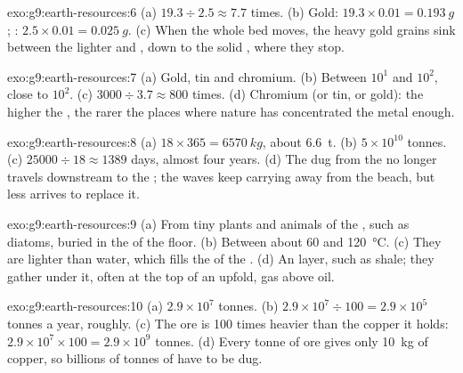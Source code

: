 \begin{solution}{exo:g9:earth-resources:6}
(a) $19.3 \div 2.5 \approx 7.7$ times. (b) Gold: $19.3 \times 0.01 =
\qty{0.193}{g}$; : $2.5 \times 0.01 = \qty{0.025}{g}$. (c) When the
whole bed moves, the heavy gold grains sink between the lighter  and
, down to the solid , where they stop.
\end{solution}

\begin{solution}{exo:g9:earth-resources:7}
(a) Gold, tin and chromium. (b) Between $10^1$ and $10^2$, close to
$10^2$. (c) $3000 \div 3.7 \approx 800$ times. (d) Chromium (or tin, or
gold): the higher the , the rarer the places where
nature has concentrated the metal enough.
\end{solution}

\begin{solution}{exo:g9:earth-resources:8}
(a) $18 \times 365 = \qty{6570}{kg}$, about \qty{6.6}{t}. (b) $5 \times
10^{10}$ tonnes. (c) $25000 \div 18 \approx 1389$ days, almost four years.
(d) The  dug from the  no longer travels downstream to the ;
the waves keep carrying  away from the beach, but less arrives to
replace it.
\end{solution}

\begin{solution}{exo:g9:earth-resources:9}
(a) From tiny plants and animals of the , such as diatoms, buried in the
 of the  floor. (b) Between about 60 and \qty{120}{\degreeCelsius}.
(c) They are lighter than water, which fills the  of the .
(d) An  layer, such as shale; they gather under it, often at
the top of an upfold, gas above oil.
\end{solution}

\begin{solution}{exo:g9:earth-resources:10}
(a) $2.9 \times 10^7$ tonnes. (b) $2.9 \times 10^7 \div 100 = 2.9 \times
10^5$ tonnes a year, roughly. (c) The ore is 100 times heavier than the
copper it holds: $2.9 \times 10^7 \times 100 = 2.9 \times 10^9$ tonnes.
(d) Every tonne of ore gives only \qty{10}{kg} of copper, so billions of
tonnes of  have to be dug.
\end{solution}

